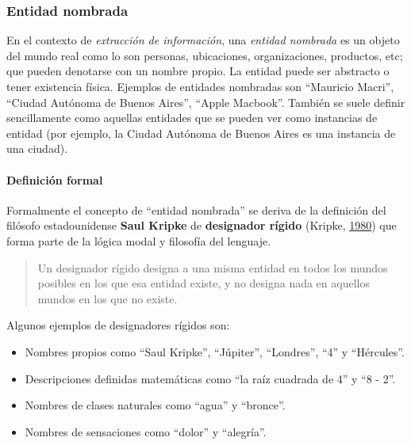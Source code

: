 \documentclass[12pt,a4paper,]{scrartcl}
\providecommand{\tightlist}{%
  \setlength{\itemsep}{0pt}\setlength{\parskip}{0pt}}
\let\oldparagraph\paragraph
\renewcommand{\paragraph}[1]{\oldparagraph{#1}\mbox{}}
\begin{document}
\hypertarget{entidad-nombrada}{%
\subsubsection{Entidad nombrada}\label{entidad-nombrada}}

En el contexto de \emph{extracción de información}, una \emph{entidad nombrada} es un objeto del mundo real como lo son personas, ubicaciones, organizaciones, productos, etc; que pueden denotarse con un nombre propio. La entidad puede ser abstracto o tener existencia física. Ejemplos de entidades nombradas son \enquote{Mauricio Macri}, \enquote{Ciudad Autónoma de Buenos Aires}, \enquote{Apple Macbook}.
También se suele definir sencillamente como aquellas entidades que se pueden ver como instancias de entidad (por ejemplo, la Ciudad Autónoma de Buenos Aires es una instancia de una ciudad).

\hypertarget{ner-formal}{%
\paragraph{Definición formal}\label{ner-formal}}

Formalmente el concepto de \enquote{entidad nombrada} se deriva de la definición del filósofo estadounidense \textbf{Saul Kripke} de \textbf{designador rígido} (Kripke, \protect\hyperlink{ref-kripke1980naming}{1980}) que forma parte de la lógica modal y filosofía del lenguaje.

\begin{quote}
Un designador rígido designa a una misma entidad en todos los mundos posibles en los que esa entidad existe, y no designa nada en aquellos mundos en los que no existe.
\end{quote}

Algunos ejemplos de designadores rígidos son:

\begin{itemize}
\tightlist
\item
  Nombres propios como \enquote{Saul Kripke}, \enquote{Júpiter}, \enquote{Londres}, \enquote{4} y \enquote{Hércules}.
\item
  Descripciones definidas matemáticas como \enquote{la raíz cuadrada de 4} y \enquote{8 - 2}.
\item
  Nombres de clases naturales como \enquote{agua} y \enquote{bronce}.
\item
  Nombres de sensaciones como \enquote{dolor} y \enquote{alegría}.
\end{itemize}
\end{document}
